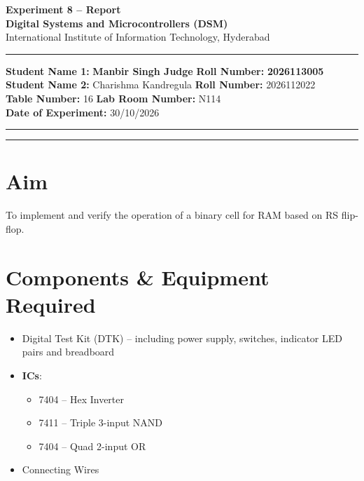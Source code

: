 \documentclass[11pt, a4paper]{article}
\begin{document}
\thispagestyle{no_hdr_border_rule}

\begin{center}
    {\Large \textbf{Experiment 8 -- Report}} \\[0.2cm]
    {\large \textbf{Digital Systems and Microcontrollers (DSM)}} \\[0.1cm]
    {\normalsize International Institute of Information Technology, Hyderabad} \\[0.3cm]
\end{center}

\vspace{0.2cm}
\hrule
\vspace{0.4cm}

\noindent \textbf{Student Name 1:} \textbf{Manbir Singh Judge} \hfill \textbf{Roll Number:} \textbf{2026113005} \\
\noindent \textbf{Student Name 2:} Charishma Kandregula \hfill \textbf{Roll Number:} 2026112022 \\
\noindent \textbf{Table Number:} 16 \hfill \textbf{Lab Room Number:} N114 \\
\noindent \textbf{Date of Experiment:} 30/10/2026

\vspace{0.4cm}
\hrule
\vspace{0.5cm}

\vspace{1em}

\tableofcontents
\vspace{0.5cm}
\hrule
\vspace{0.8cm}

\newpage
{}


\section{Aim}
To implement and verify the operation of a binary cell for RAM based on RS flip-flop.

\section{Components \& Equipment Required}
\begin{itemize}
    \item Digital Test Kit (DTK) -- including power supply, switches, indicator LED pairs and breadboard
    \item \textbf{ICs}:
    \begin{itemize}[label=$\circ$]
        \item 7404 -- Hex Inverter
        \item 7411 -- Triple 3-input NAND
        \item 7404 -- Quad 2-input OR
    \end{itemize}
    \item Connecting Wires
\end{itemize}
\end{document}
